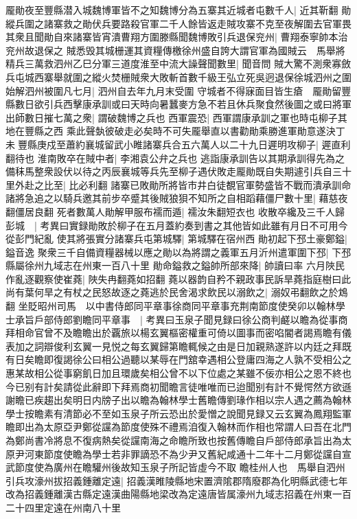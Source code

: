 龎勛夜至豐縣潜入城魏博軍皆不之知魏博分為五寨其近城者屯數千人|{
	近其靳翻}
勛縱兵圍之諸寨救之勛伏兵要路殺官軍二千人餘皆返走賊攻寨不克至夜解圍去官軍畏其衆且聞勛自來諸寨皆宵潰曹翔方圍滕縣聞魏博敗引兵退保兖州|{
	曹翔泰寧帥本治兖州故退保之}
賊悉毁其城栅運其資糧傳檄徐州盛自誇大謂官軍為國賊云　馬舉將精兵三萬救泗州乙巳分軍三道度淮至中流大譟聲聞數里|{
	聞音問}
賊大驚不測衆寡斂兵屯城西寨舉就圍之縱火焚栅賊衆大敗斬首數千級王弘立死吳迥退保徐城泗州之圍始解泗州被圍凡七月|{
	泗州自去年九月末受圍}
守城者不得寐面目皆生瘡　龎勛留豐縣數日欲引兵西擊康承訓或曰天時向暑蠶麥方急不若且休兵聚食然後圖之或曰將軍出師數日摧七萬之衆|{
	謂破魏博之兵也}
西軍震恐|{
	西軍謂康承訓之軍也時屯柳子其地在豐縣之西}
乘此聲埶彼破走必矣時不可失龎舉直以書勸勛乘勝進軍勛意遂決丁未豐縣庚戍至蕭約襄城留武小睢諸寨兵合五六萬人以二十九日遲明攻柳子|{
	遲直利翻待也}
淮南敗卒在賊中者|{
	李湘袁公弁之兵也}
逃詣康承訓告以其期承訓得先為之備秣馬整衆設伏以待之丙辰襄城等兵先至柳子遇伏敗走龎勛既自失期遽引兵自三十里外赴之比至|{
	比必利翻}
諸寨已敗勛所將皆市井白徒覩官軍勢盛皆不戰而潰承訓命諸將急追之以騎兵邀其前步卒蹙其後賊狼狽不知所之自相蹈藉僵尸數十里|{
	藉慈夜翻僵居良翻}
死者數萬人勛解甲服布襦而遁|{
	襦汝朱翻短衣也}
收散卒纔及三千人歸彭城　|{
	考異曰實録勛敗於柳子在五月蓋約奏到書之其他皆如此雖有月日不可用今從彭門紀亂}
使其將張實分諸寨兵屯第城驛|{
	第城驛在宿州西}
勛初起下邳土豪鄭鎰|{
	鎰音逸}
聚衆三千自備資糧器械以應之勛以為將謂之義軍五月沂州遣軍圍下邳|{
	下邳縣屬徐州九域志在州東一百八十里}
勛命鎰救之鎰帥所部來降|{
	帥讀曰率}
六月陜民作亂逐觀察使崔蕘|{
	陜失冉翻蕘如招翻}
蕘以器韵自矜不親政事民訴旱蕘指庭樹曰此尚有葉何旱之有杖之民怒故逐之蕘逃於民舍渴求飲民以溺飲之|{
	溺奴弔翻飲之於鴆翻}
坐貶昭州司馬　以中書侍郎同平章事徐商同平章事充荆南節度使癸卯以翰林學士承旨戶部侍郎劉瞻同平章事　|{
	考異曰玉泉子聞見録曰徐公商判鹺以瞻為從事商拜相命官曾不及瞻瞻出於覊旅以楊玄翼樞密權重可倚以圖事而密啗閽者謁焉瞻有儀表加之詞辯俊利玄翼一見悦之每玄翼歸第瞻輒候之由是日加親熟遂許以内廷之拜既有日矣瞻即復謁徐公曰相公過聽以某辱在門舘幸遇相公登庸四海之人孰不受相公之惠某故相公從事窮飢日加且環歲矣相公曾不以下位處之某雖不佞亦相公之恩不終也今已别有計矣請從此辭即下拜焉商初聞瞻言徒唯唯而已迨聞别有計不覺愕然方欲遜謝瞻已疾趨出矣明日内牓子出以瞻為翰林學士舊瞻傳劉瑑作相以宗人遇之薦為翰林學士按瞻素有清節必不至如玉泉子所云恐出於愛憎之說聞見録又云玄翼為鳳翔監軍瞻即出為太原亞尹鄭從讜為節度使殊不禮焉洎復入翰林而作相也常謂人曰吾在北門為鄭尚書冷將息不復病熱矣從讜南海之命瞻所致也按舊傳瞻自戶部侍郎承旨出為太原尹河東節度使瞻為學士若非罪謫恐不為少尹又舊紀咸通十二年十二月鄭從讜自宣武節度使為廣州在瞻驩州後故知玉泉子所記皆虛今不取}
瞻桂州人也　馬舉自泗州引兵攻濠州拔招義鍾離定遠|{
	招義漢睢陵縣地宋置濟隂郡隋廢郡為化明縣武德七年改為招義鍾離漢古縣定遠漢曲陽縣地梁改為定遠唐皆属濠州九域志招義在州東一百二十四里定遠在州南八十里}
